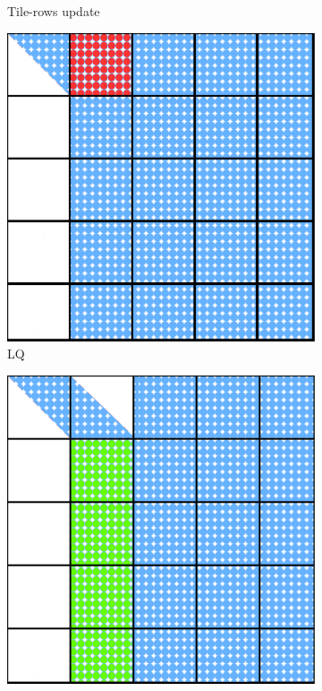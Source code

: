 \begin{figure}[h!]
\begin{subfigure}{0.2 \textwidth}
    \caption{\label{fig:tile_qr_update_3}Tile-rows update}
  \end{subfigure}
  \hfill
  \begin{subfigure}{0.2 \textwidth}
    \includegraphics[width=\textwidth]{fig/SVD_tile_7_grid}
      \caption{\label{fig:tile_lq_2}LQ }
  \end{subfigure}
  \hfill
  \begin{subfigure}{0.2 \textwidth}
    \includegraphics[width=\textwidth]{fig/SVD_tile_8_grid}

\end{subfigure}
\end{figure}
